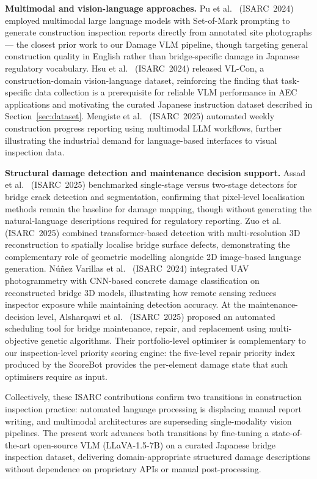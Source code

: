 \documentclass[twocolumn]{article}
\begin{document}
\textbf{Multimodal and vision-language approaches.}
Pu et al.~\cite{pu2024mllm} (ISARC~2024) employed multimodal large
language models with Set-of-Mark prompting to generate construction
inspection reports directly from annotated site photographs --- the
closest prior work to our Damage VLM pipeline, though targeting
general construction quality in English rather than bridge-specific
damage in Japanese regulatory vocabulary.
Hsu et al.~\cite{hsu2024vlcon} (ISARC~2024) released VL-Con, a
construction-domain vision-language dataset, reinforcing the finding
that task-specific data collection is a prerequisite for reliable VLM
performance in AEC applications and motivating the curated Japanese
instruction dataset described in Section~\ref{sec:dataset}.
Mengiste et al.~\cite{mengiste2025progress} (ISARC~2025) automated
weekly construction progress reporting using multimodal LLM workflows,
further illustrating the industrial demand for language-based interfaces
to visual inspection data.

\textbf{Structural damage detection and maintenance decision support.}
Assad et al.~\cite{assad2025crack} (ISARC~2025) benchmarked
single-stage versus two-stage detectors for bridge crack detection
and segmentation, confirming that pixel-level localisation methods
remain the baseline for damage mapping, though without generating the
natural-language descriptions required for regulatory reporting.
Zuo et al.~\cite{zuo2025transformer} (ISARC~2025) combined
transformer-based detection with multi-resolution 3D reconstruction
to spatially localise bridge surface defects, demonstrating the
complementary role of geometric modelling alongside 2D image-based
language generation.
N\'{u}\~{n}ez Varillas et al.~\cite{nunez2024bridge} (ISARC~2024)
integrated UAV photogrammetry with CNN-based concrete damage
classification on reconstructed bridge 3D models, illustrating
how remote sensing reduces inspector exposure while maintaining
detection accuracy.
At the maintenance-decision level, Alsharqawi et al.~\cite{alsharqawi2025mrr}
(ISARC~2025) proposed an automated scheduling tool for bridge
maintenance, repair, and replacement using multi-objective genetic
algorithms.
Their portfolio-level optimiser is complementary to our inspection-level
priority scoring engine: the five-level repair priority index produced
by the ScoreBot provides the per-element damage state that such
optimisers require as input.

Collectively, these ISARC contributions confirm two transitions in
construction inspection practice: automated language processing is
displacing manual report writing, and multimodal architectures are
superseding single-modality vision pipelines.
The present work advances both transitions by fine-tuning a
state-of-the-art open-source VLM (LLaVA-1.5-7B) on a curated Japanese
bridge inspection dataset, delivering domain-appropriate structured
damage descriptions without dependence on proprietary APIs or
manual post-processing.
\end{document}
